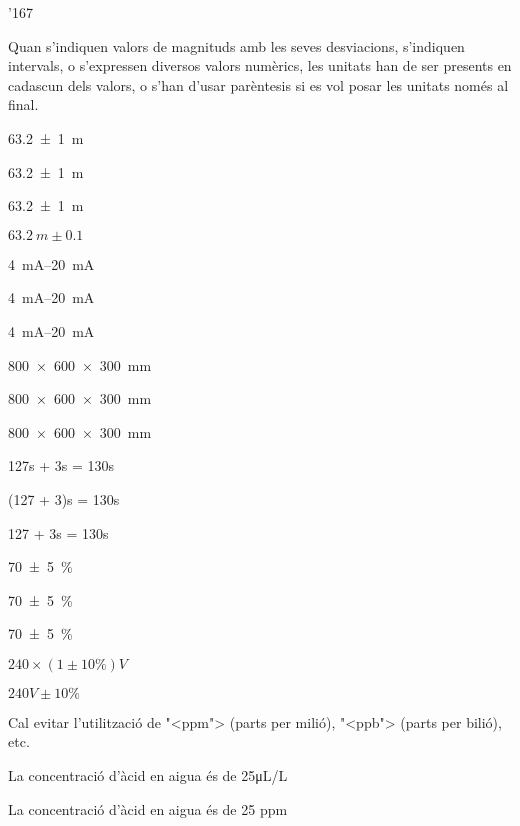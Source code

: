 \begin{dinglist}{'167}

\item Quan s'indiquen valors de magnituds amb les seves desviacions,
s'indiquen intervals, o s'expressen diversos valors num\`{e}rics, les
unitats han de ser presents en cadascun dels valors, o s'han d'usar
par\`{e}ntesis si es vol posar les unitats nom\'{e}s al final.

\textcolor{Green}{} \SI[separate-uncertainty, multi-part-units = repeat]{63,2(1)}{m}

\textcolor{Green}{} \SI[separate-uncertainty]{63,2(1)}{m}

\textcolor{Red}{} \SI[separate-uncertainty, multi-part-units = single]{63,2(1)}{m}

\textcolor{Red}{}  $\SI{63,2}{m} \pm \num{0,1}$


\textcolor{Green}{} \SIrange{4}{20}{mA}

\textcolor{Green}{} \SIrange[range-units = brackets]{4}{20}{mA}

\textcolor{Red}{} \SIrange[range-units = single]{4}{20}{mA}


\textcolor{Green}{} \SI{800 x 600 x 300}{mm}

\textcolor{Green}{} \SI[product-units = brackets]{800 x 600 x 300}{mm}

\textcolor{Red}{} \SI[product-units = single]{800 x 600 x 300}{mm}


\textcolor{Green}{} 127\unit{s} + 3\unit{s} = 130\unit{s}

\textcolor{Green}{}  (127 + 3)\unit{s} = 130\unit{s}

\textcolor{Red}{}  127 + 3\unit{s} = 130\unit{s}


\textcolor{Green}{} \SI[separate-uncertainty, multi-part-units = repeat]{70(5)}{\%}

\textcolor{Green}{} \SI[separate-uncertainty]{70(5)}{\%}

\textcolor{Red}{} \SI[separate-uncertainty, multi-part-units = single]{70(5)}{\%}


\textcolor{Green}{} $240 \times (1 \pm 10\unit{\%})\unit{V}$

\textcolor{Red}{}  $240\unit{V} \pm 10\unit{\%}$


\item Cal evitar l'utilitzaci\'{o} de {"<}ppm{">} (parts per mili\'{o}), {"<}ppb{">} (parts per bili\'{o}), etc.

\textcolor{Green}{} La concentraci\'{o} d'\`{a}cid en aigua \'{e}s de 25\unit{\micro L/L}

\textcolor{Red}{} La concentraci\'{o} d'\`{a}cid en aigua \'{e}s de 25 ppm

\end{dinglist}

